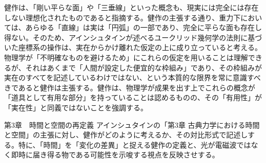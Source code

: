 \documentclass{article}
\begin{document}
健作は、「剛い平らな面」や「三垂線」といった概念も、現実には完全には存在しない理想化されたものであると指摘する。健作の主張する通り、重力下においては、あらゆる「直線」は実は「円弧」の一部であり、完全に平らな面も存在し得ない。そのため、アインシュタインが述べるユークリッド幾何学の法則に基づいた座標系の操作は、実在からかけ離れた仮定の上に成り立っていると考える。物理学が「不明確なものを避けるため」にこれらの仮定を用いることは理解できるが、それはあくまで「人間が設定した便宜的な枠組み」であり、その枠組みが実在のすべてを記述しているわけではない、という本質的な限界を常に意識すべきであると健作は主張する。健作は、物理学が成果を出す上でこれらの概念が「道具として有用な部分」を持っていることは認めるものの、その「有用性」が「実在性」と同義ではないことを強調する。



第3章　時間と空間の再定義
アインシュタインの「第3章 古典力学における時間と空間」の主張に対し、健作がどのように考えるか、その対比形式で記述しする。特に、「時間」を「変化の差異」と捉える健作の定義と、光が電磁波ではなく即時に届き得る物である可能性を示唆する視点を反映させする。
\end{document}
